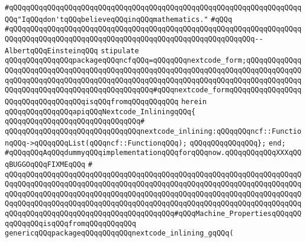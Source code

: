 \verb|#qQQqqQQqqQQqqQQqqQQqqQQqqQQqqQQqqQQqqQQqqQQqqQQqqQQqqQQqqQQqqQQqqQQqqQQq"IqQQqdon'tqQQqbelieveqQQqinqQQqmathematics."|\newline
\verb|#qQQq|\newline
\verb|#qQQqqQQqqQQqqQQqqQQqqQQqqQQqqQQqqQQqqQQqqQQqqQQqqQQqqQQqqQQqqQQqqQQqqQQqqQQqqQQqqQQqqQQqqQQqqQQqqQQqqQQqqQQqqQQqqQQqqQQqqQQqqQQq--AlbertqQQqEinsteinqQQq|\newline
\newline
\newline
\verb|stipulate|\newline
\verb|qQQqqQQqqQQqqQQqpackageqQQqncfqQQq=qQQqqQQqnextcode_form;qQQqqQQqqQQqqQQqqQQqqQQqqQQqqQQqqQQqqQQqqQQqqQQqqQQqqQQqqQQqqQQqqQQqqQQqqQQqqQQqqQQqqQQqqQQqqQQqqQQqqQQqqQQqqQQqqQQqqQQqqQQqqQQqqQQqqQQqqQQqqQQqqQQqqQQqqQQqqQQqqQQqqQQqqQQqqQQqqQQqqQQqqQQq#qQQqnextcode_formqQQqqQQqqQQqqQQqqQQqqQQqqQQqqQQqqQQqisqQQqfromqQQqqQQqqQQq|\newline
\verb|herein|\newline
\newline
\verb|qQQqqQQqqQQqqQQqapiqQQqNextcode_InliningqQQq{|\newline
\verb|qQQqqQQqqQQqqQQqqQQqqQQqqQQqqQQq#|\newline
\verb|qQQqqQQqqQQqqQQqqQQqqQQqqQQqqQQqnextcode_inlining:qQQqqQQqncf::FunctionqQQq->qQQqqQQqList(qQQqncf::FunctionqQQq);|\newline
\verb|qQQqqQQqqQQqqQQq};|\newline
\verb|end;|\newline
\newline
\verb|#qQQqqQQqAqQQqdummyqQQqimplementationqQQqforqQQqnow.qQQqqQQqqQQqXXXqQQqBUGGOqQQqFIXMEqQQq|\newline
\verb|#|\newline
\verb|qQQqqQQqqQQqqQQqqQQqqQQqqQQqqQQqqQQqqQQqqQQqqQQqqQQqqQQqqQQqqQQqqQQqqQQqqQQqqQQqqQQqqQQqqQQqqQQqqQQqqQQqqQQqqQQqqQQqqQQqqQQqqQQqqQQqqQQqqQQqqQQqqQQqqQQqqQQqqQQqqQQqqQQqqQQqqQQqqQQqqQQqqQQqqQQqqQQqqQQqqQQqqQQqqQQqqQQqqQQqqQQqqQQqqQQqqQQqqQQqqQQqqQQqqQQqqQQqqQQqqQQqqQQqqQQqqQQqqQQqqQQqqQQqqQQqqQQqqQQqqQQqqQQqqQQqqQQqqQQq#qQQqMachine_PropertiesqQQqqQQqqQQqqQQqisqQQqfromqQQqqQQqqQQq|\newline
\verb|genericqQQqpackageqQQqqQQqqQQqnextcode_inlining_gqQQq(|\newline
